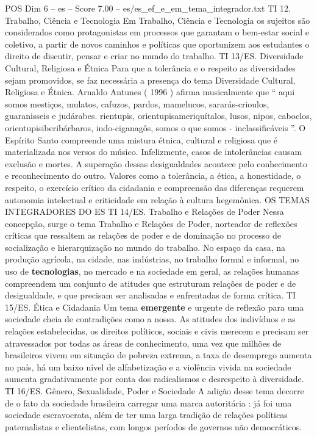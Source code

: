\begin{textsample}{POS Dim 6 – es – Score 7.00 – es/es\_ef\_e\_em\_tema\_integrador.txt}
TI 12.
Trabalho, Ciência e Tecnologia Em Trabalho, Ciência e Tecnologia os sujeitos são considerados como protagonistas em processos que garantam o bem-estar social e coletivo, a partir de novos caminhos e políticas que oportunizem aos estudantes o direito de discutir, pensar e criar no mundo do trabalho.
TI 13/ES.
Diversidade Cultural, Religiosa e Étnica Para que a tolerância e o respeito as diversidades sejam promovidos, se faz necessária a presença do tema Diversidade Cultural, Religiosa e Étnica.
Arnaldo Antunes ( 1996 ) afirma musicalmente que “ aqui somos mestiços, mulatos, cafuzos, pardos, mamelucos, sararás-crioulos, guaranisseis e judárabes. rientupis, orientupisameriquítalos, lusos, nipos, caboclos, orientupisiberibárbaros, indo-ciganagôs, somos o que somos - inclassificáveis ”.
O Espírito Santo compreende uma mistura étnica, cultural e religiosa que é materializada nos versos do músico.
Infelizmente, casos de intolerâncias causam exclusão e mortes.
A superação dessas desigualdades acontece pelo conhecimento e reconhecimento do outro.
Valores como a tolerância, a ética, a honestidade, o respeito, o exercício crítico da cidadania e compreensão das diferenças requerem autonomia intelectual e criticidade em relação à cultura hegemônica.
OS TEMAS INTEGRADORES DO ES TI 14/ES.
Trabalho e Relações de Poder Nessa concepção, surge o tema Trabalho e Relações de Poder, norteador de reflexões críticas que ressaltem as relações de poder e de dominação no processo de socialização e hierarquização no mundo do trabalho.
No espaço da casa, na produção agrícola, na cidade, nas indústrias, no trabalho formal e informal, no uso de \textbf{tecnologias}, no mercado e na sociedade em geral, as relações humanas compreendem um conjunto de atitudes que estruturam relações de poder e de desigualdade, e que precisam ser analisadas e enfrentadas de forma crítica.
TI 15/ES.
Ética e Cidadania Um tema \textbf{emergente} e urgente de reflexão para uma sociedade cheia de contradições como a nossa.
As atitudes dos indivíduos e as relações estabelecidas, os direitos políticos, sociais e civis merecem e precisam ser atravessados por todas as áreas de conhecimento, uma vez que milhões de brasileiros vivem em situação de pobreza extrema, a taxa de desemprego aumenta no país, há um baixo nível de alfabetização e a violência vivida na sociedade aumenta gradativamente por conta dos radicalismos e desrespeito à diversidade.
TI 16/ES.
Gênero, Sexualidade, Poder e Sociedade A adição desse tema decorre de o fato da sociedade brasileira carregar uma marca autoritária : já foi uma sociedade escravocrata, além de ter uma larga tradição de relações políticas paternalistas e clientelistas, com longos períodos de governos não democráticos.

\end{textsample}

